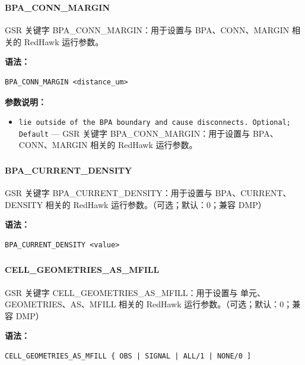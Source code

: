\subsubsection{}
\paragraph*{BPA_CONN_MARGIN}

GSR 关键字 BPA_CONN_MARGIN：用于设置与 BPA、CONN、MARGIN 相关的 RedHawk 运行参数。

\textbf{语法：}
\begin{lstlisting}
BPA_CONN_MARGIN <distance_um>
\end{lstlisting}

\textbf{参数说明：}
\begin{itemize}
\item \texttt{lie outside of the BPA boundary and cause disconnects. Optional; Default} — GSR 关键字 BPA\_CONN\_MARGIN：用于设置与 BPA、CONN、MARGIN 相关的 RedHawk 运行参数。
\end{itemize}

\subsubsection{}
\paragraph*{BPA_CURRENT_DENSITY}

GSR 关键字 BPA_CURRENT_DENSITY：用于设置与 BPA、CURRENT、DENSITY 相关的 RedHawk 运行参数。（可选；默认：0；兼容 DMP）

\textbf{语法：}
\begin{lstlisting}
BPA_CURRENT_DENSITY <value>
\end{lstlisting}

\subsubsection{}
\paragraph*{CELL_GEOMETRIES_AS_MFILL}

GSR 关键字 CELL_GEOMETRIES_AS_MFILL：用于设置与 单元、GEOMETRIES、AS、MFILL 相关的 RedHawk 运行参数。（可选；默认：0；兼容 DMP）

\textbf{语法：}
\begin{lstlisting}
CELL_GEOMETRIES_AS_MFILL { OBS | SIGNAL | ALL/1 | NONE/0 ]
\end{lstlisting}

